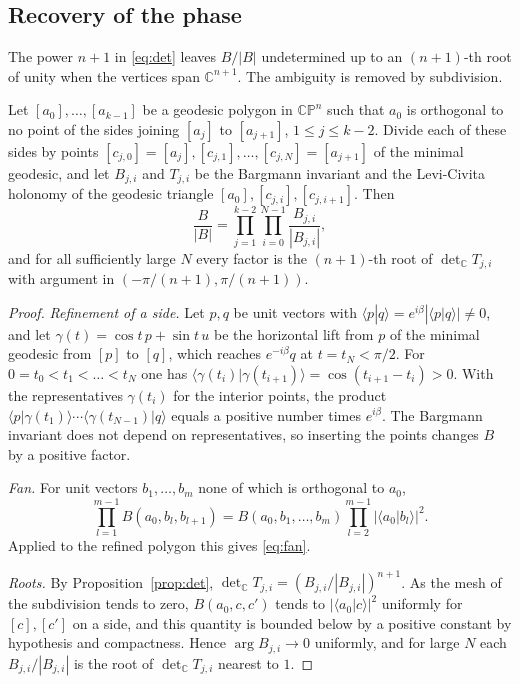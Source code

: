 \subsection{Recovery of the phase}
The power $n+1$ in \eqref{eq:det} leaves $B/|B|$ undetermined up to an $(n+1)$-th root of unity when the vertices span $\mathbb{C}^{n+1}$. The ambiguity is removed by subdivision.

\begin{proposition}\label{prop:fan}
Let $[a_0],\dots,[a_{k-1}]$ be a geodesic polygon in $\mathbb{CP}^n$ such that $a_0$ is orthogonal to no point of the sides joining $[a_j]$ to $[a_{j+1}]$, $1\le j\le k-2$. Divide each of these sides by points $[c_{j,0}]=[a_j],[c_{j,1}],\dots,[c_{j,N}]=[a_{j+1}]$ of the minimal geodesic, and let $B_{j,i}$ and $T_{j,i}$ be the Bargmann invariant and the Levi-Civita holonomy of the geodesic triangle $[a_0],[c_{j,i}],[c_{j,i+1}]$. Then
\begin{equation}\label{eq:fan}
\frac{B}{|B|}=\prod_{j=1}^{k-2}\prod_{i=0}^{N-1}\frac{B_{j,i}}{|B_{j,i}|},
\end{equation}
and for all sufficiently large $N$ every factor is the $(n+1)$-th root of $\det_{\mathbb{C}}T_{j,i}$ with argument in $(-\pi/(n+1),\pi/(n+1))$.
\end{proposition}
\begin{proof}
\emph{Refinement of a side.} Let $p,q$ be unit vectors with $\langle p|q\rangle=e^{i\beta}|\langle p|q\rangle|\ne0$, and let $\gamma(t)=\cos t\,p+\sin t\,u$ be the horizontal lift from $p$ of the minimal geodesic from $[p]$ to $[q]$, which reaches $e^{-i\beta}q$ at $t=t_N<\pi/2$. For $0=t_0<t_1<\dots<t_N$ one has $\langle\gamma(t_i)|\gamma(t_{i+1})\rangle=\cos(t_{i+1}-t_i)>0$. With the representatives $\gamma(t_i)$ for the interior points, the product $\langle p|\gamma(t_1)\rangle\cdots\langle\gamma(t_{N-1})|q\rangle$ equals a positive number times $e^{i\beta}$. The Bargmann invariant does not depend on representatives, so inserting the points changes $B$ by a positive factor.

\emph{Fan.} For unit vectors $b_1,\dots,b_m$ none of which is orthogonal to $a_0$,
\[
\prod_{l=1}^{m-1}B(a_0,b_l,b_{l+1})=B(a_0,b_1,\dots,b_m)\prod_{l=2}^{m-1}|\langle a_0|b_l\rangle|^2 .
\]
Applied to the refined polygon this gives \eqref{eq:fan}.

\emph{Roots.} By Proposition~\ref{prop:det}, $\det_{\mathbb{C}}T_{j,i}=(B_{j,i}/|B_{j,i}|)^{n+1}$. As the mesh of the subdivision tends to zero, $B(a_0,c,c')$ tends to $|\langle a_0|c\rangle|^2$ uniformly for $[c],[c']$ on a side, and this quantity is bounded below by a positive constant by hypothesis and compactness. Hence $\arg B_{j,i}\to0$ uniformly, and for large $N$ each $B_{j,i}/|B_{j,i}|$ is the root of $\det_{\mathbb{C}}T_{j,i}$ nearest to $1$.
\end{proof}

